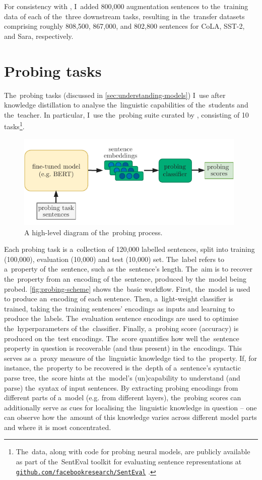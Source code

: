 \documentclass[bsc,frontabs,singlespacing,parskip,deptreport]{infthesis}
\newcommand\rurl[1]{%
  \href{https://#1}{\nolinkurl{#1}}%
}
\begin{document}
{{    For consistency with \citet{Tang_2019b}, I~added 800,000 augmentation sentences to the~training data of each of the~three downstream tasks, resulting in the~transfer datasets comprising roughly 808,500, 867,000, and 802,800 sentences for CoLA, SST-2, and Sara, respectively.
  }

  \section{Probing tasks}{
    \label{sec:probing-tasks}
    The~probing tasks (discussed in \autoref{sec:understanding-models}) I~use after knowledge distillation to analyse the~linguistic capabilities of the~students and the~teacher. In particular, I~use the~probing suite curated by \citet{Conneau_2018}, consisting of 10 tasks\footnote{The~data, along with code for probing neural models, are publicly available as part of the~SentEval toolkit for evaluating sentence representations \citep{SentEval-paper} at \rurl{github.com/facebookresearch/SentEval}.}.

    \begin{figure}[h!t]
      \centering
      \includegraphics[width=11cm]{graphics/probing-scheme}
      \caption{A high-level diagram of the~probing process.}
      \label{fig:probing-scheme}
    \end{figure}

    Each probing task is a~collection of 120,000 labelled sentences, split into training (100,000), evaluation (10,000) and test (10,000) set. The~label refers to a~property of the~sentence, such as the~sentence's length. The~aim is to recover the~property from an~encoding of the~sentence, produced by the~model being probed. \autoref{fig:probing-scheme} shows the~basic workflow. First, the~model is used to produce an~encoding of each sentence. Then, a~light-weight classifier is trained, taking the~training sentences' encodings as inputs and learning to produce the~labels. The~evaluation sentence encodings are used to optimise the~hyperparameters of the~classifier. Finally, a~probing score (accuracy) is produced on the~test encodings. The~score quantifies how well the~sentence property in question is recoverable (and thus present) in the~encodings. This serves as a~proxy measure of the~linguistic knowledge tied to the~property. If, for instance, the~property to be recovered is the~depth of a~sentence's syntactic parse tree, the~score hints at the~model's (un)capability to understand (and parse) the~syntax of input sentences.
    By extracting probing encodings from different parts of a~model (e.g. from different layers), the~probing scores can additionally serve as cues for localising the~linguistic knowledge in question -- one can observe how the~amount of this knowledge varies across different model parts and where it is most concentrated.

}}
\end{document}

